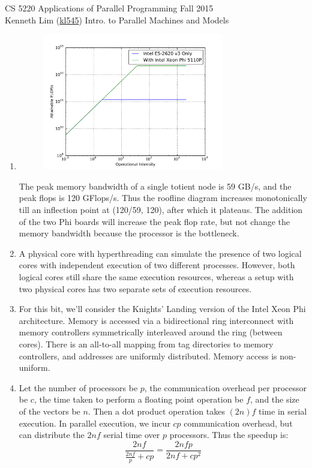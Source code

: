 \documentclass{scrartcl}
\begin{document}
  \begin{framed}
  \large
  CS 5220 Applications of Parallel Programming \hfill Fall 2015 \\
  Kenneth Lim (\href{mailto:kl545@cornell.edu}{kl545}) \hfill Intro. to Parallel Machines and Models \hspace{-3ex}
  \end{framed}
  \begin{enumerate}
    \item
    \begin{figure}[ht!]
      \centering
      \includegraphics[width=0.75\textwidth]{roofline}
    \end{figure}
    The peak memory bandwidth of a single totient node is 59 GB/s, and the peak flops is 120 GFlops/s. Thus the roofline diagram increases monotonically till an inflection point at (120/59, 120), after which it plateaus. The addition of the two Phi boards will increase the peak flop rate, but not change the memory bandwidth because the processor is the bottleneck.
    \item A physical core with hyperthreading can simulate the presence of two logical cores with independent execution of two different processes. However, both logical cores still share the same execution resources, whereas a setup with two physical cores has two separate sets of execution resources.
    \item For this bit, we'll consider the Knights' Landing version of the Intel Xeon Phi architecture. Memory is accessed via a bidirectional ring interconnect with memory controllers symmetrically interleaved around the ring (between cores). There is an all-to-all mapping from tag directories to memory controllers, and addresses are uniformly distributed. Memory access is non-uniform.
    \item Let the number of processors be $p$, the communication overhead per processor be $c$, the time taken to perform a floating point operation be $f$, and the size of the vectors be $n$. Then a dot product operation takes $(2n)f$ time in serial execution. In parallel execution, we incur $cp$ communication overhead, but can distribute the $2nf$ serial time over $p$ processors. Thus the speedup is:
    \[
      \frac{2nf}{\frac{2nf}{p} + cp} = \frac{2nfp}{2nf + cp^2}
    \]
  \end{enumerate}
\end{document}
